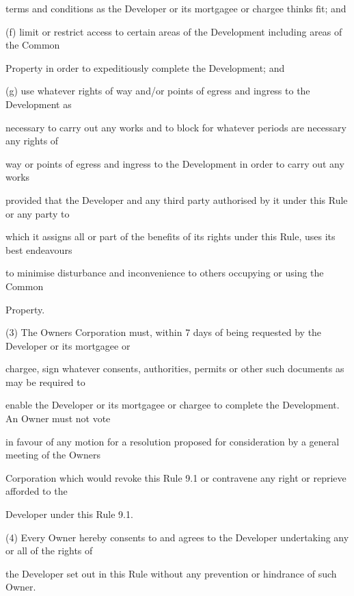\documentclass{article}
\begin{document}
{\fontsize{10.02}{1}terms and conditions as the Developer or its mortgagee or chargee thinks fit; and }

{\fontsize{9.962}{1}(f) limit or restrict access to certain areas of the Development including areas of the Common }

{\fontsize{10.02}{1}Property in order to expeditiously complete the Development; and }

{\fontsize{9.962}{1}(g) use whatever rights of way and/or points of egress and ingress to the Development as }

{\fontsize{10.02}{1}necessary to carry out any works and to block for whatever periods are necessary any rights of }

{\fontsize{10.02}{1}way or points of egress and ingress to the Development in order to carry out any works }

{\fontsize{10.02}{1}provided that the Developer and any third party authorised by it under this Rule or any party to }

{\fontsize{10.02}{1}which it assigns all or part of the benefits of its rights under this Rule, uses its best endeavours }

{\fontsize{10.02}{1}to minimise disturbance and inconvenience to others occupying or using the Common }

{\fontsize{10.02}{1}Property. }

{\fontsize{9.962}{1}(3) The Owners Corporation must, within 7 days of being requested by the Developer or its mortgagee or }

{\fontsize{10.02}{1}chargee, sign whatever consents, authorities, permits or other such documents as may be required to }

{\fontsize{10.02}{1}enable the Developer or its mortgagee or chargee to complete the Development. An Owner must not vote }

{\fontsize{10.02}{1}in favour of any motion for a resolution proposed for consideration by a general meeting of the Owners }

{\fontsize{10.02}{1}Corporation which would revoke this Rule 9.1 or contravene any right or reprieve afforded to the }

{\fontsize{10.02}{1}Developer under this Rule 9.1. }

{\fontsize{9.962}{1}(4) Every Owner hereby consents to and agrees to the Developer undertaking any or all of the rights of }

{\fontsize{10.02}{1}the Developer set out in this Rule without any prevention or hindrance of such Owner. }
\end{document}
